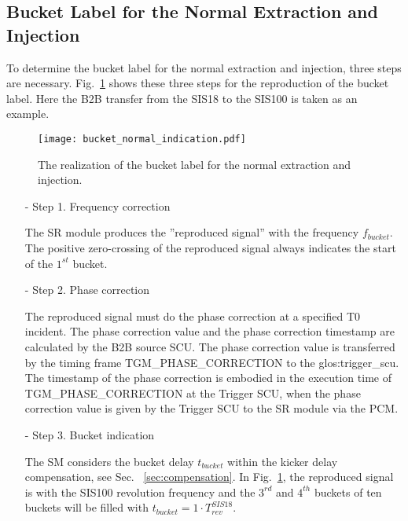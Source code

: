 \subsection{Bucket Label for the Normal Extraction and Injection}

To determine the bucket label for the normal extraction and injection, three steps are necessary. Fig.~\ref{bucket_label} shows these three steps for the reproduction of the bucket label. Here the B2B transfer from the SIS18 to the SIS100 is taken as an example.
\begin{figure}[!htb]
   \centering   
   \texttt{[image: bucket\_normal\_indication.pdf]}
   \caption{The realization of the bucket label for the normal extraction and injection.}
   \label{bucket_label}
\end{figure}  
\begin{itemize}
\item[-] Step 1. Frequency correction

The \gls{SR} module produces the ''reproduced signal'' with the frequency $f_{\mathit{bucket}}$. The positive zero-crossing of the reproduced signal always indicates the start of the $1^{st}$ bucket.
\item[-] Step 2. Phase correction

The reproduced signal must do the phase correction at a specified T0 incident. The phase correction value and the phase correction timestamp are calculated by the B2B source SCU. The phase correction value is transferred by the timing frame TGM\_PHASE\_CORRECTION to the \gls{glos:trigger_scu}. The timestamp of the phase correction is embodied in the execution time of TGM\_PHASE\_CORRECTION at the Trigger SCU, when the phase correction value is given by the Trigger SCU to the SR module via the PCM.


\item[-] Step 3. Bucket indication

The SM considers the bucket delay $t_{\mathit{bucket}}$ within the kicker delay compensation, see Sec. ~\ref{sec:compensation}. In Fig.~\ref{bucket_label}, the reproduced signal is with the SIS100 revolution frequency and the $3^{rd}$ and $4^{th}$ buckets of ten buckets will be filled with $t_{\mathit{bucket}}=1\cdot T_{\mathit{rev}}^{\mathit{SIS18}}$. 
\end{itemize}

